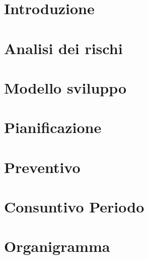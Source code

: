 \documentclass[a4paper, oneside, openany, dvipsnames, table]{article}
\begin{document}
    \copertina{}
    
    
    
    \newpage
    \tableofcontents
    
    \newpage
    \listoftables
    
    \newpage
    \listoffigures
    
    \newpage
    \section{Introduzione}\label{sec:Introduzione}
    

    \newpage
    \section{Analisi dei rischi}\label{sec:Analisi-rischi}
    

    \newpage
    \section{Modello sviluppo}\label{sec:Modello-sviluppo}
    

    \newpage
    \section{Pianificazione}\label{sec:Pianificazione}
    

    \newpage
    \section{Preventivo}\label{sec:Preventivo}
    

    \newpage
    \section{Consuntivo Periodo}\label{sec:Consuntivo-periodo}
    

    \newpage
    \section{Organigramma}\label{sec:Organigramma}
    
\end{document}

